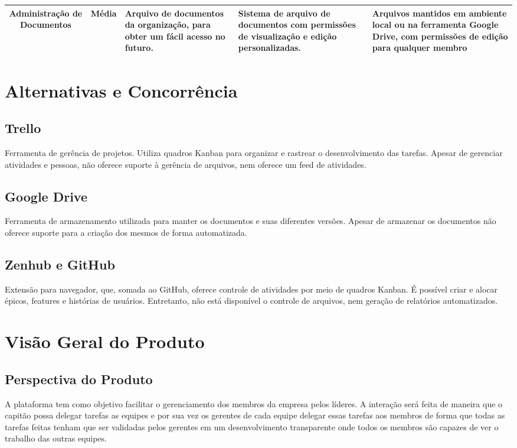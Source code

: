 \begin{apendicesenv}
\begin{table}[!h]
\begin{tabular}{|c|c|l|l|l|}
  \parbox[t]{3cm}{Administração de Documentos}  & Média                                    & \parbox[t]{4cm}{Arquivo de documentos da organização, para obter um fácil acesso no futuro.}                           & \parbox[t]{3.4cm}{Sistema de arquivo de documentos com permissões de visualização e edição personalizadas.}  & \parbox[t]{3cm}{Arquivos mantidos em ambiente local ou na ferramenta Google Drive, com permissões de edição para qualquer membro} \\ \hline
  \end{tabular}
\end{table}

\pagebreak

\section{Alternativas e Concorrência}
\subsection{Trello}
Ferramenta de gerência de projetos. Utiliza quadros Kanban para organizar e rastrear o desenvolvimento das tarefas. Apesar de gerenciar atividades e pessoas, não oferece suporte à gerência de arquivos, nem oferece um feed de atividades.

\subsection{Google Drive}
Ferramenta de armazenamento utilizada para manter os documentos e suas diferentes versões. Apesar de armazenar os documentos não oferece suporte para a criação dos mesmos de forma automatizada.

\subsection{Zenhub e GitHub}
Extensão para navegador, que, somada ao GitHub, oferece controle de atividades por meio de quadros Kanban. É possível criar e alocar épicos, features e histórias de usuários. Entretanto, não está disponível o controle de arquivos, nem geração de relatórios automatizados.

\section{Visão Geral do Produto}
\subsection{Perspectiva do Produto}
A plataforma tem como objetivo facilitar o gerenciamento dos membros da empresa pelos líderes. A interação será feita de maneira que o capitão possa delegar tarefas as equipes e por sua vez os gerentes de cada equipe delegar essas tarefas aos membros de forma que todas as tarefas feitas tenham que ser validadas pelos gerentes em um desenvolvimento transparente onde todos os membros são capazes de ver o trabalho das outras equipes.


\end{apendicesenv}
